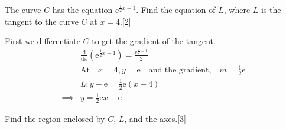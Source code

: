 \documentclass[12pt, a4 paper]{article}
\begin{document}
\begin{outline}[enumerate]
	\1 The curve $C$ has the equation $\mathrm{e}^{\frac{1}{2}x-1}$.
	\2 Find the equation of $L$, where $L$ is the tangent to the curve $C$ at $x=4$.\hfill[2]
	\begin{answer}
		First we differentiate $C$ to get the gradient of the tangent.
		\begin{align*}
			         & {\frac{\mathrm{d}}{\mathrm{d}x}}(\mathrm{e}^{\frac{1}{2}x-1}) = \frac{\mathrm{e}^{\frac{x}{2}-1}}{2} \\
			         & \textrm{At} \quad x=4, y=\mathrm{e} \quad \textrm{and the gradient,} \quad m=\frac{1}{2}\mathrm{e}   \\
			         & L: y-\mathrm{e} = \frac{1}{2}\mathrm{e}(x-4)                                                         \\
			\implies & y=\frac{1}{2}\mathrm{e}x - \mathrm{e}                                                                
		\end{align*}
	\end{answer}
	\2 Find the region enclosed by $C$, $L$, and the axes.\hfill[3]
	\begin{answer}
\end{answer}
\end{outline}
\end{document}
